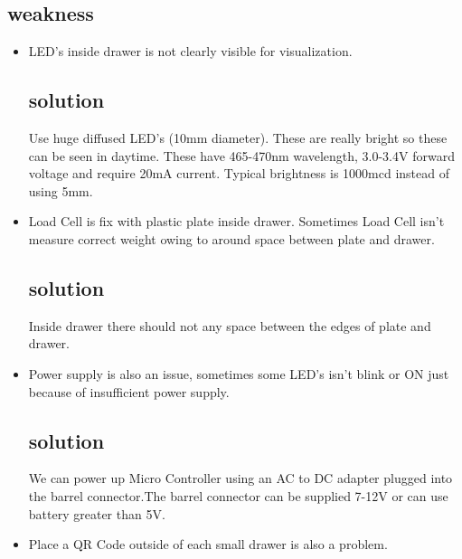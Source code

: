 \subsection{weakness}
\begin{itemize}
  \item LED's inside drawer is not clearly visible for visualization.
        \subsection{solution}
         Use huge diffused LED's (10mm diameter). These are really bright so these can be seen in daytime. These have 465-470nm wavelength, 3.0-3.4V forward voltage and require 20mA current. Typical brightness is 1000mcd instead of using 5mm.
  \item Load Cell is fix with plastic plate inside drawer. Sometimes Load Cell isn't measure correct weight owing to around space between plate and drawer.
  		 \subsection{solution}
  		 Inside drawer there should not any space between the edges of plate and drawer.
  \item  Power supply is also an issue, sometimes some LED's isn't blink or ON just because of insufficient power supply.
  	   \subsection{solution}
  	    We can power up Micro Controller using an AC to DC adapter plugged into the barrel connector.The barrel connector can be supplied 7-12V or can use battery greater than 5V. 
  \item Place a QR Code outside of each small drawer is also a problem.

\end{itemize}
